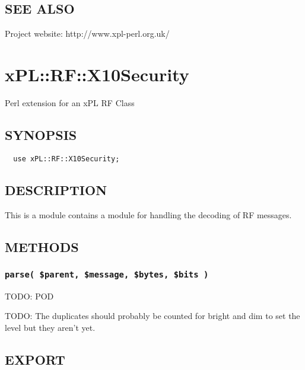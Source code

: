 \documentclass[12pt,a4paper]{article}
\begin{document}
\subsection*{SEE ALSO\label{xPL::RF::X10_SEE_ALSO}}


Project website: http://www.xpl-perl.org.uk/

\newpage
\section{xPL::RF::X10Security\label{xPL::RF::X10Security}}


Perl extension for an xPL RF Class

\subsection*{SYNOPSIS\label{xPL::RF::X10Security_SYNOPSIS}}
\begin{verbatim}
  use xPL::RF::X10Security;
\end{verbatim}
\subsection*{DESCRIPTION\label{xPL::RF::X10Security_DESCRIPTION}}


This is a module contains a module for handling the decoding of RF
messages.

\subsection*{METHODS\label{xPL::RF::X10Security_METHODS}}
\subsubsection*{\texttt{parse( \$parent, \$message, \$bytes, \$bits )}\label{xPL::RF::X10Security_parse_parent_message_bytes_bits_}}


TODO: POD



TODO: The duplicates should probably be counted for bright and dim to set
the level but they aren't yet.

\subsection*{EXPORT\label{xPL::RF::X10Security_EXPORT}}
\end{document}
